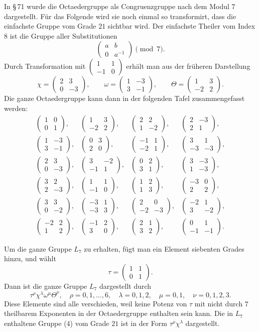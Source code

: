 \documentclass[11pt]{article}
\providecommand{\mat}[4]{\begin{pmatrix}#1&#2\\#3&#4\end{pmatrix}}
\providecommand{\mat}[4]{\begin{pmatrix}#1&#2\\#3&#4\end{pmatrix}}
\begin{document}
In \S\,71 wurde die Octaedergruppe als Congruenzgruppe nach dem Modul $7$ dargestellt. Für das Folgende wird sie noch einmal so transformirt, dass die einfachste Gruppe vom Grade $21$ sichtbar wird. Der einfachste Theiler vom Index $8$ ist die Gruppe aller Substitutionen
\begin{equation}
 \mat{a}{b}{0}{a^{-1}}\pmod 7.
 \tag{4}
\end{equation}
Durch Transformation mit $\mat{1}{1}{-1}{0}$ erhält man aus der früheren Darstellung
\begin{equation}
 \chi=\mat{2}{3}{0}{-3},\qquad
 \omega=\mat{1}{-3}{3}{-1},\qquad
 \Theta=\mat{1}{3}{-2}{2}.
 \tag{5}
\end{equation}
Die ganze Octaedergruppe kann dann in der folgenden Tafel zusammengefasst werden:
\begin{equation}
\begin{array}{rrrr}
\mat{1}{0}{0}{1},&\mat{1}{3}{-2}{2},&\mat{2}{2}{1}{-2},&\mat{2}{-3}{2}{1},\\[0.7em]
\mat{1}{-3}{3}{-1},&\mat{0}{3}{2}{0},&\mat{-1}{1}{-2}{1},&\mat{3}{1}{-3}{-3},\\[0.7em]
\mat{2}{3}{0}{-3},&\mat{3}{-2}{-1}{1},&\mat{0}{2}{3}{1},&\mat{3}{-3}{1}{-3},\\[0.7em]
\mat{3}{2}{2}{-3},&\mat{1}{1}{-1}{0},&\mat{1}{2}{1}{3},&\mat{-3}{0}{2}{2},\\[0.7em]
\mat{3}{3}{0}{-2},&\mat{-3}{1}{-3}{3},&\mat{2}{0}{-2}{-3},&\mat{-2}{1}{3}{-2},\\[0.7em]
\mat{-2}{2}{1}{2},&\mat{-1}{2}{3}{0},&\mat{2}{1}{3}{2},&\mat{0}{1}{-1}{-1}.
\end{array}
\tag{6}
\end{equation}

Um die ganze Gruppe $L_7$ zu erhalten, fügt man ein Element siebenten Grades hinzu, und wählt
\begin{equation}
 \tau=\mat{1}{1}{0}{1}.
 \tag{7}
\end{equation}
Dann ist die ganze Gruppe $L_7$ dargestellt durch
\begin{equation}
 \tau^{\rho}\chi^{\lambda}\omega^{\mu}\Theta^{\nu},
 \quad \rho=0,1,\ldots,6,
 \quad \lambda=0,1,2,
 \quad \mu=0,1,
 \quad \nu=0,1,2,3.
 \tag{8}
\end{equation}
Diese Elemente sind alle verschieden, weil keine Potenz von $\tau$ mit nicht durch $7$ theilbarem Exponenten in der Octaedergruppe enthalten sein kann. Die in $L_7$ enthaltene Gruppe (4) vom Grade $21$ ist in der Form $\tau^\rho\chi^\lambda$ dargestellt.
\end{document}
